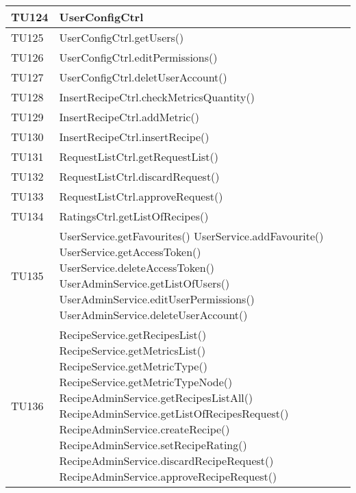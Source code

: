 \begin{center}
\begin{longtable}{| p{3cm} | p{9.5cm} |}
					\hline
					TU124 & UserConfigCtrl \\
					\hline
					TU125 & UserConfigCtrl.getUsers() \\
					\hline
					TU126 & UserConfigCtrl.editPermissions() \\
					\hline
					TU127 & UserConfigCtrl.deletUserAccount() \\
					\hline
					TU128 & InsertRecipeCtrl.checkMetricsQuantity() \\
					\hline
					TU129 & InsertRecipeCtrl.addMetric() \\
					\hline
					TU130 & InsertRecipeCtrl.insertRecipe() \\
					\hline
					TU131 & RequestListCtrl.getRequestList() \\
					\hline
					TU132 & RequestListCtrl.discardRequest() \\
					\hline
					TU133 & RequestListCtrl.approveRequest() \\
					\hline
					TU134 & RatingsCtrl.getListOfRecipes() \\
					\hline
					TU135 & UserService.getFavourites() \newline
					UserService.addFavourite() \newline
					UserService.getAccessToken() \newline
					UserService.deleteAccessToken() \newline
					UserAdminService.getListOfUsers() \newline
					UserAdminService.editUserPermissions() \newline
					UserAdminService.deleteUserAccount() \\
					\hline
					TU136 & RecipeService.getRecipesList() \newline
					RecipeService.getMetricsList() \newline
					RecipeService.getMetricType() \newline
					RecipeService.getMetricTypeNode() \newline
					RecipeAdminService.getRecipesListAll() \newline
					RecipeAdminService.getListOfRecipesRequest() \newline
					RecipeAdminService.createRecipe() \newline
					RecipeAdminService.setRecipeRating() \newline
					RecipeAdminService.discardRecipeRequest() \newline
					RecipeAdminService.approveRecipeRequest() \\

\end{longtable}
\end{center}

